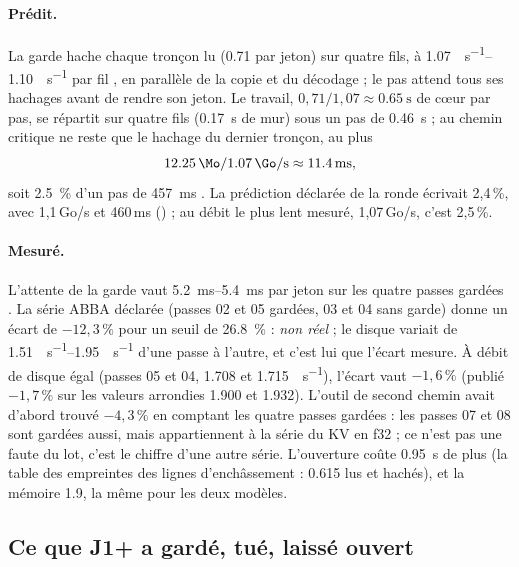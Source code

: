 \paragraph{Prédit.} La garde hache chaque tronçon lu (\SI{0.71}{\Go} par jeton) sur quatre fils, à \SIrange{1.07}{1.10}{\Go\per\second} par fil \mes, en parallèle de la copie et du décodage ; le pas attend tous ses hachages avant de rendre son jeton. Le travail, $0{,}71 / 1{,}07 \approx \SI{0.65}{\second}$ de cœur par pas, se répartit sur quatre fils (\SI{0.17}{\second} de mur) sous un pas de \SI{0.46}{\second} ; au chemin critique ne reste que le hachage du dernier tronçon, au plus
\[
\SI{12.25}{\Mo} / \SI{1.07}{\Go\per\second} \approx \SI{11.4}{\milli\second},
\]
soit \SI{2.5}{\percent} d'un pas de \SI{457}{\milli\second} \calc. La prédiction déclarée de la ronde écrivait 2,4\,\%, avec 1,1\,Go/s et 460\,ms () ; au débit le plus lent mesuré, 1,07\,Go/s, c'est 2,5\,\%.

\paragraph{Mesuré.} L'attente de la garde vaut \SIrange{5.2}{5.4}{\milli\second} par jeton sur les quatre passes gardées \mes. La série ABBA déclarée (passes 02 et 05 gardées, 03 et 04 sans garde) donne un écart de $-12{,}3\,\%$ pour un seuil de \SI{26.8}{\percent} : \emph{non réel} ; le disque variait de \SIrange{1.51}{1.95}{\Go\per\second} d'une passe à l'autre, et c'est lui que l'écart mesure. À débit de disque égal (passes 05 et 04, \num{1.708} et \SI{1.715}{\Go\per\second}), l'écart vaut $-1{,}6\,\%$ (publié $-1{,}7\,\%$ sur les valeurs arrondies \num{1.900} et \num{1.932}). L'outil de second chemin avait d'abord trouvé $-4{,}3\,\%$ en comptant les quatre passes gardées : les passes 07 et 08 sont gardées aussi, mais appartiennent à la série du KV en f32 ; ce n'est pas une faute du lot, c'est le chiffre d'une autre série. L'ouverture coûte \SI{0.95}{\second} de plus (la table des empreintes des lignes d'enchâssement : \SI{0.615}{\Go} lus et hachés), et la mémoire \SI{1.9}{\Mo}, la même pour les deux modèles.

\subsection{Ce que J1+ a gardé, tué, laissé ouvert}\label{t2res-sec:j1plus}

